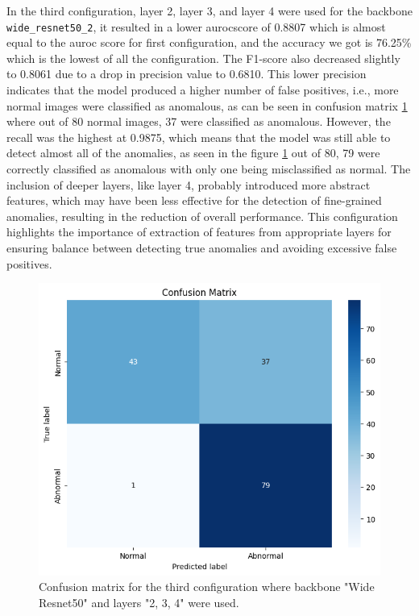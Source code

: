 In the third configuration, layer 2, layer 3, and layer 4 were used for the backbone \texttt{wide\_resnet50\_2}, it resulted in a lower \gls{auroc}score of 0.8807 which is almost equal to the \gls{auroc} score for first configuration, and the accuracy we got is 76.25\% which is the lowest of all the configuration. The F1-score also decreased slightly to 0.8061 due to a drop in precision value to 0.6810. This lower precision indicates that the model produced a higher number of false positives, i.e., more normal images were classified as anomalous, as can be seen in confusion matrix \ref{fig:patchcore config3 confusion matrix} where out of 80 normal images, 37 were classified as anomalous. However, the recall was the highest at 0.9875, which means that the model was still able to detect almost all of the anomalies, as seen in the figure \ref{fig:patchcore config3 confusion matrix} out of 80, 79 were correctly classified as anomalous with only one being misclassified as normal. The inclusion of deeper layers, like layer 4, probably introduced more abstract features, which may have been less effective for the detection of fine-grained anomalies, resulting in the reduction of overall performance. This configuration highlights the importance of extraction of features from appropriate layers for ensuring balance between detecting true anomalies and avoiding excessive false positives.

\begin{figure}[ht!]
    \centering
    \includegraphics[width=1\linewidth]{Rohit_Master_Thesis//Images/patchcore_config3_confusion_matrix.jpg}
    \caption{Confusion matrix for the third configuration where backbone "Wide Resnet50" and layers "2, 3, 4" were used.}
    \label{fig:patchcore config3 confusion matrix}
\end{figure}

